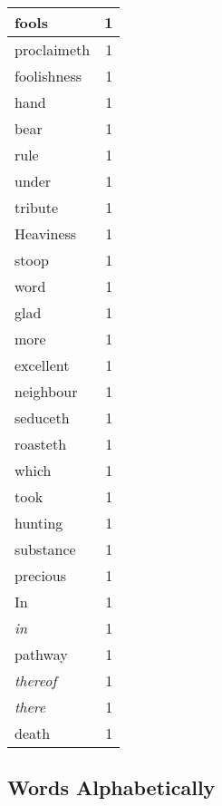 \begin{center}
\begin{longtable}{l|r}
fools & 1\\ \hline 
proclaimeth & 1\\ \hline 
foolishness & 1\\ \hline 
hand & 1\\ \hline 
bear & 1\\ \hline 
rule & 1\\ \hline 
under & 1\\ \hline 
tribute & 1\\ \hline 
Heaviness & 1\\ \hline 
stoop & 1\\ \hline 
word & 1\\ \hline 
glad & 1\\ \hline 
more & 1\\ \hline 
excellent & 1\\ \hline 
neighbour & 1\\ \hline 
seduceth & 1\\ \hline 
roasteth & 1\\ \hline 
which & 1\\ \hline 
took & 1\\ \hline 
hunting & 1\\ \hline 
substance & 1\\ \hline 
precious & 1\\ \hline 
In & 1\\ \hline 
\emph{in} & 1\\ \hline 
pathway & 1\\ \hline 
\emph{thereof} & 1\\ \hline 
\emph{there} & 1\\ \hline 
death & 1\\ \hline 
\end{longtable}  
\end{center}  


  
\normalsize  

  
  


\subsection{Words Alphabetically}


